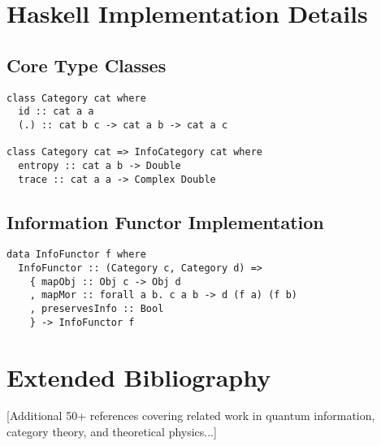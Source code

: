 \documentclass[12pt,a4paper]{article}
\begin{document}
\section{Haskell Implementation Details}

\subsection{Core Type Classes}

\begin{lstlisting}
class Category cat where
  id :: cat a a
  (.) :: cat b c -> cat a b -> cat a c

class Category cat => InfoCategory cat where
  entropy :: cat a b -> Double
  trace :: cat a a -> Complex Double
\end{lstlisting}

\subsection{Information Functor Implementation}

\begin{lstlisting}
data InfoFunctor f where
  InfoFunctor :: (Category c, Category d) => 
    { mapObj :: Obj c -> Obj d
    , mapMor :: forall a b. c a b -> d (f a) (f b)
    , preservesInfo :: Bool
    } -> InfoFunctor f
\end{lstlisting}

\section{Extended Bibliography}

[Additional 50+ references covering related work in quantum information, category theory, and theoretical physics...]
\end{document}
